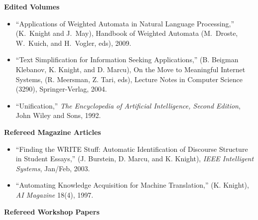 \noindent
{\bf Edited Volumes}
\begin{itemize}

\item ``Applications of Weighted Automata in Natural Language
Processing,'' (K.~Knight and J.~May), Handbook of Weighted
Automata (M.~Droste, W.~Kuich, and H.~Vogler, eds), 2009.

\item ``Text Simplification for Information Seeking Applications,''
(B. Beigman Klebanov, K. Knight, and D. Marcu), On the Move
to Meaningful Internet Systems, (R. Meersman, Z. Tari, eds),
Lecture Notes in Computer Science (3290), Springer-Verlag, 2004.

\item ``Unification,'' {\em The Encyclopedia of
Artificial Intelligence, Second Edition}, John Wiley and Sons, 1992.

\end{itemize}

\noindent
{\bf Refereed Magazine Articles}
\begin{itemize}
\item ``Finding the WRITE Stuff: Automatic Identification of Discourse 
Structure in Student Essays,'' (J. Burstein, D. Marcu, and K. Knight), 
{\em IEEE Intelligent Systems}, Jan/Feb, 2003.

\item ``Automating Knowledge Acquisition for Machine Translation,''
(K. Knight),
{\em AI Magazine} 18(4), 1997.

\end{itemize}

\noindent
{\bf Refereed Workshop Papers}

